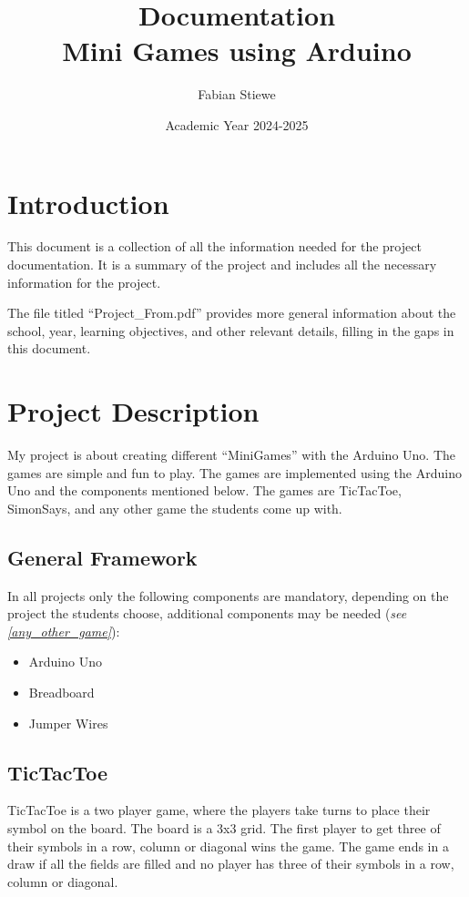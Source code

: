 \documentclass[10pt, oneside]{article}
\title{\textbf{Documentation} \\ Mini Games using Arduino}
\author{Fabian Stiewe}
\date{Academic Year 2024-2025}
\theoremstyle{remark}
\begin{document}
\maketitle
\tableofcontents

\newpage

\section{Introduction}
This document is a collection of all the information needed for the project documentation. It is a summary of the project and includes all the necessary information for the project.

\vspace{1em}

The file titled \enquote{Project\_From.pdf} provides more general information about the school, year, learning objectives, and other relevant details, filling in the gaps in this document.

\section{Project Description}

My project is about creating different \enquote{MiniGames} with the Arduino Uno. The games are simple and fun to play. The games are implemented using the Arduino Uno and the components mentioned below. The games are TicTacToe, SimonSays, and any other game the students come up with.

\subsection{General Framework}
In all projects only the following components are mandatory, depending on the project the students choose, additional components may be needed (\textit{see \ref{any_other_game}}):
\begin{itemize}
  \item Arduino Uno
  \item Breadboard
  \item Jumper Wires
\end{itemize}

\subsection{TicTacToe}
TicTacToe is a two player game, where the players take turns to place their symbol on the board. The board is a 3x3 grid. The first player to get three of their symbols in a row, column or diagonal wins the game. The game ends in a draw if all the fields are filled and no player has three of their symbols in a row, column or diagonal.
\end{document}
